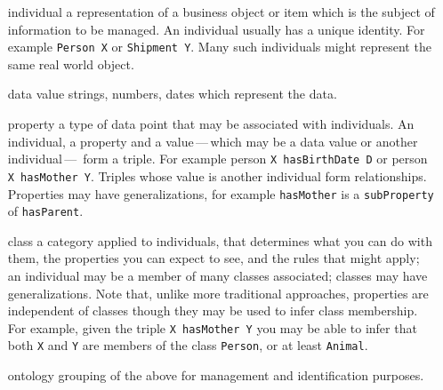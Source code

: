 \begin{itemize}[leftmargin=.8in,font=\itshape]
    \item [individual] a representation of a business object or item which is the subject of information to be managed.
                       An individual usually has a unique identity.
                       For example \lstinline|Person X| or \lstinline|Shipment Y|.
                       Many such individuals might represent the same real world object.
    \item [data value] strings, numbers, dates which represent the data.
    \item [property]   a type of data point that may be associated with individuals.
                       An individual, a property and a value\,---\,which may be a data value or another
                       individual\,---\, form a triple.\newline
                       For example person \lstinline|X hasBirthDate D| or person \lstinline|X hasMother Y|.
                       Triples whose value is another individual form relationships.
                       Properties may have generalizations, for example \lstinline|hasMother| is a
                       \lstinline|subProperty| of \lstinline|hasParent|.
    \item [class]      a category applied to individuals, that determines what you can do with them,
                       the properties you can expect to see, and the rules that might apply;
                       an individual may be a member of many classes associated;
                       classes may have generalizations.
                       Note that, unlike more traditional approaches, properties are independent of
                       classes though they may be used to infer class membership.
                       For example, given the triple \lstinline|X hasMother Y| you may be able to infer that both
                       \lstinline|X| and \lstinline|Y| are members of the class \lstinline|Person|,
                       or at least \lstinline|Animal|.
    \item [ontology]   grouping of the above for management and identification purposes.
\end{itemize}



